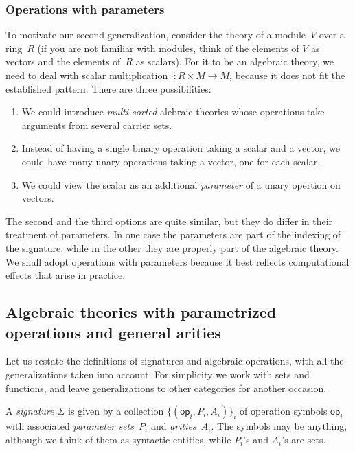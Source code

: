 \documentclass{amsart}
\newcommand{\family}[2]{\{#1\}_{#2}} %
\newcommand{\op}[1]{\mathsf{op}_{#1}} %
\begin{document}
\subsubsection{Operations with parameters}
\label{sec:oper-with-param}

To motivate our second generalization, consider the theory of a module~$V$ over
a ring~$R$ (if you are not familiar with modules, think of the elements of $V$
as vectors and the elements of~$R$ as scalars). For it to be an algebraic
theory, we need to deal with scalar multiplication ${\cdot} : R \times M \to M$,
because it does not fit the established pattern. There are three possibilities:
%
\begin{enumerate}
\item We could introduce \emph{multi-sorted} alebraic theories whose operations
  take arguments from several carrier sets.
\item Instead of having a single binary operation taking a scalar and a vector,
  we could have many unary operations taking a vector, one for each scalar.
\item We could view the scalar as an additional \emph{parameter} of a
  unary opertion on vectors.
\end{enumerate}
%
The second and the third options are quite similar, but they do differ in their
treatment of parameters. In one case the parameters are part of the indexing of
the signature, while in the other they are properly part of the algebraic
theory. We shall adopt operations with parameters because it best reflects
computational effects that arise in practice.

\subsection{Algebraic theories with parametrized operations and general arities}
\label{sec:algebr-theor-with}

Let us restate the definitions of signatures and algebraic operations, with all
the generalizations taken into account. For simplicity we work with sets and
functions, and leave generalizations to other categories for another occasion.

A \emph{signature $\Sigma$} is given by a collection
$\family{(\op{i}, P_i, A_i)}{i}$ of operation symbols $\op{i}$ with associated
\emph{parameter sets~$P_i$} and \emph{arities~$A_i$}. The symbols may be
anything, although we think of them as syntactic entities, while $P_i$'s and
$A_i$'s are sets.
\end{document}
